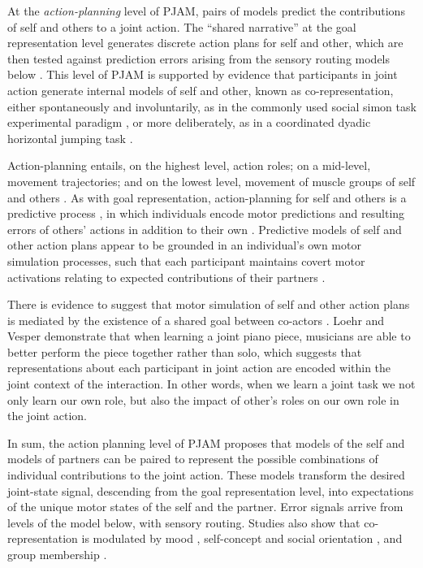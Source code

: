 \begin{CJK}{UTF8}{gbsn}
At the \textit{action-planning} level of PJAM, pairs of models predict the contributions of self and others to a joint action.  The ``shared narrative'' at the goal representation level generates discrete action plans for self and other, which are then tested against prediction errors arising from the sensory routing models below \citep{Pesquita2017}.  This level of PJAM is supported by evidence that participants in joint action generate internal models of self and other, known as co-representation, either spontaneously and involuntarily, as in the commonly used social simon task experimental paradigm \citep{Sebanz2003,Atmaca2008}, or more deliberately, as in a coordinated dyadic horizontal jumping task \citep{Vesper2012}.

Action-planning entails, on the highest level, action roles; on a mid-level, movement trajectories; and on the lowest level, movement of muscle groups of self and others \citep{Pesquita2017}.  As with goal representation, action-planning for self and others is a predictive process \citep{Flanagan2003}, in which individuals encode motor predictions and resulting errors of others' actions in addition to their own \citep{VanSchie2004,Radke2011}.  Predictive models of self and other action plans appear to be grounded in an individual's own motor simulation processes, such that each participant maintains covert motor activations relating to expected contributions of their partners \citep{Hollander2012}.

There is evidence to suggest that motor simulation of self and other action plans is mediated by the existence of a shared goal between co-actors \citep{Kourtis2010}.  Loehr and Vesper \textcite{Loehr2016} demonstrate that when learning a joint piano piece, musicians are able to better perform the piece together rather than solo, which suggests that representations about each participant in joint action are encoded within the joint context of the interaction.  In other words, when we learn a joint task we not only learn our own role, but also the impact of other's roles on our own role in the joint action.

In sum, the action planning level of PJAM proposes that models of the self and models of partners can be paired to represent the possible combinations of individual contributions to the joint action. These models transform the desired joint-state signal, descending from the goal representation level, into expectations of the unique motor states of the self and the partner.  Error signals arrive from levels of the model below, with sensory routing.  Studies also show that co-representation is modulated by mood \citep[positive or negative affect, see][]{Kuhbandner2010}, self-concept and social orientation \citep{Colzato2012,Colzato2012a}, and group membership \citep{DeBruijn2008,Iani2013}.


\end{CJK}
